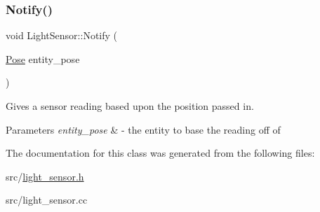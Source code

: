 \subsubsection{\texorpdfstring{Notify()}{Notify()}}
{\footnotesize\ttfamily void Light\+Sensor\+::\+Notify (\begin{DoxyParamCaption}\item[{\mbox{\hyperlink{struct_pose}{Pose}}}]{entity\+\_\+pose }\end{DoxyParamCaption})\hspace{0.3cm}{\ttfamily [override]}}



Gives a sensor reading based upon the position passed in. 


\begin{DoxyParams}{Parameters}
{\em entity\+\_\+pose} & -\/ the entity to base the reading off of \\
\hline
\end{DoxyParams}


The documentation for this class was generated from the following files\+:\begin{DoxyCompactItemize}
\item 
src/\mbox{\hyperlink{light__sensor_8h}{light\+\_\+sensor.\+h}}\item 
src/light\+\_\+sensor.\+cc\end{DoxyCompactItemize}
